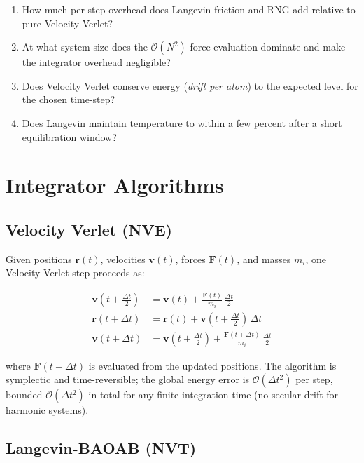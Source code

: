 \documentclass[11pt,a4paper]{article}
\theoremstyle{definition}
\theoremstyle{plain}
\newcommand{\dt}{\Delta t}
\begin{document}
\begin{enumerate}
  \item How much per-step overhead does Langevin friction and RNG add relative
	to pure Velocity Verlet?
  \item At what system size does the $\mathcal{O}(N^2)$ force evaluation
	dominate and make the integrator overhead negligible?
  \item Does Velocity Verlet conserve energy (\emph{drift per atom}) to the
	expected level for the chosen time-step?
  \item Does Langevin maintain temperature to within a few percent after a
	short equilibration window?
\end{enumerate}

\section{Integrator Algorithms}
\label{sec:algorithms}

\subsection{Velocity Verlet (NVE)}
\label{sec:vv}

Given positions $\mathbf{r}(t)$, velocities $\mathbf{v}(t)$, forces
$\mathbf{F}(t)$, and masses $m_i$, one Velocity Verlet step proceeds as:

\begin{align}
  \mathbf{v}(t + \tfrac{\dt}{2}) &= \mathbf{v}(t)
	+ \frac{\mathbf{F}(t)}{m_i}\,\frac{\dt}{2}
	\label{eq:vv-halfkick}\\
  \mathbf{r}(t + \dt) &= \mathbf{r}(t)
	+ \mathbf{v}(t + \tfrac{\dt}{2})\,\dt
	\label{eq:vv-drift}\\
  \mathbf{v}(t + \dt) &= \mathbf{v}(t + \tfrac{\dt}{2})
	+ \frac{\mathbf{F}(t+\dt)}{m_i}\,\frac{\dt}{2}
	\label{eq:vv-halfkick2}
\end{align}

where $\mathbf{F}(t+\dt)$ is evaluated from the updated positions.
The algorithm is symplectic and time-reversible; the global energy error
is $\mathcal{O}(\dt^2)$ per step, bounded $\mathcal{O}(\dt^2)$ in total
for any finite integration time (no secular drift for harmonic systems).

\subsection{Langevin-BAOAB (NVT)}
\label{sec:langevin}
\end{document}
